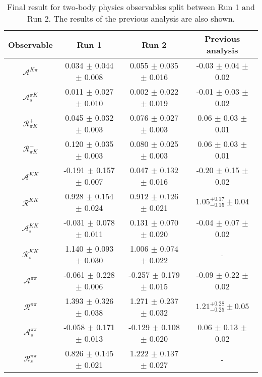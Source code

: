 \begin{table}
\centering
\begin{tabular}{cccc}
    Observable & Run 1 & Run 2 & Previous analysis\\
\midrule
    $\mathcal{A}^{K\pi}$ & 0.034 $\pm$ 0.044 $\pm$ 0.008 & 0.055 $\pm$ 0.035 $\pm$ 0.016 & -0.03 $\pm$ 0.04 $\pm$ 0.02 \\
    $\mathcal{A}_s^{\pi K}$ & 0.011 $\pm$ 0.027 $\pm$ 0.010 & 0.002 $\pm$ 0.022 $\pm$ 0.019 & -0.01 $\pm$ 0.03 $\pm$ 0.02 \\
    $\mathcal{R}_{\pi K}^+$ & 0.045 $\pm$ 0.032 $\pm$ 0.003 & 0.076 $\pm$ 0.027 $\pm$ 0.003 & 0.06 $\pm$ 0.03 $\pm$ 0.01 \\
    $\mathcal{R}_{\pi K}^-$ & 0.120 $\pm$ 0.035 $\pm$ 0.003 & 0.080 $\pm$ 0.025 $\pm$ 0.003 & 0.06 $\pm$ 0.03 $\pm$ 0.01 \\
    $\mathcal{A}^{KK}$ & -0.191 $\pm$ 0.157 $\pm$ 0.007 & 0.047 $\pm$ 0.132 $\pm$ 0.016 & -0.20 $\pm$ 0.15 $\pm$ 0.02 \\
    $\mathcal{R}^{KK}$ & 0.928 $\pm$ 0.154 $\pm$ 0.024 & 0.912 $\pm$ 0.126 $\pm$ 0.021 & $1.05^{+0.17}_{-0.15} \pm 0.04$ \\
    $\mathcal{A}_s^{KK}$ & -0.031 $\pm$ 0.078 $\pm$ 0.011 & 0.131 $\pm$ 0.070 $\pm$ 0.020 & -0.04 $\pm$ 0.07 $\pm$ 0.02 \\
    $\mathcal{R}_{s}^{KK}$ & 1.140 $\pm$ 0.093 $\pm$ 0.030 & 1.006 $\pm$ 0.074 $\pm$ 0.022 & \-- \\
    $\mathcal{A}^{\pi\pi}$ & -0.061 $\pm$ 0.228 $\pm$ 0.006 & -0.257 $\pm$ 0.179 $\pm$ 0.015 & -0.09 $\pm$ 0.22 $\pm$ 0.02 \\
    $\mathcal{R}^{\pi\pi}$ & 1.393 $\pm$ 0.326 $\pm$ 0.038 & 1.271 $\pm$ 0.237 $\pm$ 0.032 & $1.21^{+0.28}_{-0.25} \pm 0.05$ \\
    $\mathcal{A}_s^{\pi\pi}$ & -0.058 $\pm$ 0.171 $\pm$ 0.013 & -0.129 $\pm$ 0.108 $\pm$ 0.020 & 0.06 $\pm$ 0.13 $\pm$ 0.02 \\
    $\mathcal{R}_{s}^{\pi\pi}$ & 0.826 $\pm$ 0.145 $\pm$ 0.021 & 1.222 $\pm$ 0.137 $\pm$ 0.027 & \-- \\
\end{tabular}
\caption{Final result for two-body physics observables split between Run 1 and Run 2. The results of the previous analysis are also shown.}
\label{tab:results_splitObs_twoBody}
\end{table}
